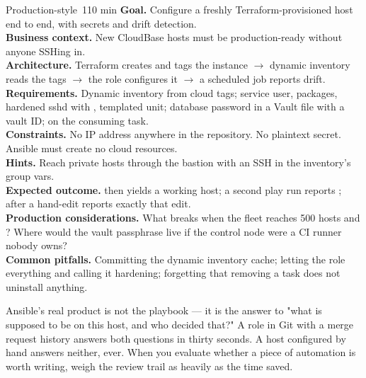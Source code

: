 \begin{minilab}{Production-style}{~110 min}
\textbf{Goal.} Configure a freshly Terraform-provisioned host end to end, with secrets and drift detection.\\
\textbf{Business context.} New CloudBase hosts must be production-ready without anyone SSHing in.\\
\textbf{Architecture.} Terraform creates and tags the instance $\rightarrow$ dynamic inventory reads the tags $\rightarrow$ the  role configures it $\rightarrow$ a scheduled  job reports drift.\\
\textbf{Requirements.} Dynamic inventory from cloud tags; service user, packages, hardened sshd with , templated  unit; database password in a Vault file with a  vault ID;  on the consuming task.\\
\textbf{Constraints.} No IP address anywhere in the repository. No plaintext secret. Ansible must create no cloud resources.\\
\textbf{Hints.} Reach private hosts through the bastion with an SSH  in the inventory's group vars.\\
\textbf{Expected outcome.}  then  yields a working host; a second play run reports ;  after a hand-edit reports exactly that edit.\\
\textbf{Production considerations.} What breaks when the fleet reaches 500 hosts and ? Where would the vault passphrase live if the control node were a CI runner nobody owns?\\
\textbf{Common pitfalls.} Committing the dynamic inventory cache; letting the role  everything and calling it hardening; forgetting that removing a task does not uninstall anything.
\end{minilab}


\begin{opsnote}
Ansible's real product is not the playbook --- it is the answer to "what is supposed to be on this host, and who decided that?" A role in Git with a merge request history answers both questions in thirty seconds. A host configured by hand answers neither, ever. When you evaluate whether a piece of automation is worth writing, weigh the review trail as heavily as the time saved.
\end{opsnote}

